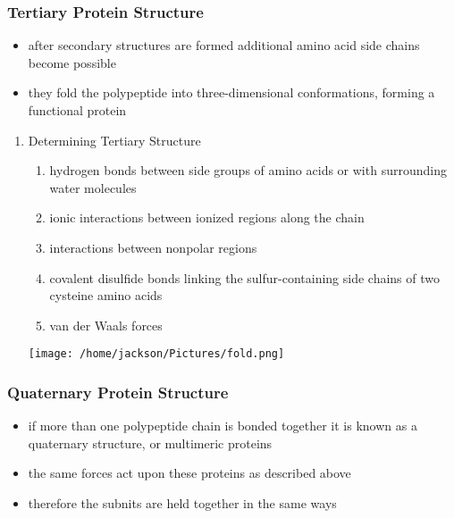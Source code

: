 \documentclass[11pt]{article}
\begin{document}
\subsubsection{Tertiary Protein Structure}
\label{sec:orgdaed8f0}
\begin{itemize}
\item after secondary structures are formed additional amino acid side chains become possible
\item they fold the polypeptide into three-dimensional conformations,  forming a functional protein
\end{itemize}
\begin{enumerate}
\item Determining Tertiary Structure
\label{sec:orga9916fd}
\begin{enumerate}
\item hydrogen bonds between side groups of amino acids or with surrounding water molecules
\item ionic interactions between ionized regions along the chain
\item interactions between nonpolar regions
\item covalent disulfide bonds linking the sulfur-containing side chains of two cysteine amino acids
\item van der Waals forces
\end{enumerate}
\begin{center}
\texttt{[image: /home/jackson/Pictures/fold.png]}
\end{center}
\end{enumerate}
\subsubsection{Quaternary Protein Structure}
\label{sec:org21dfd37}
\begin{itemize}
\item if more than one polypeptide chain is bonded together it is known as a quaternary structure, or multimeric proteins
\item the same forces act upon these proteins as described above
\item therefore the subnits are held together in the same ways
\end{itemize}
\end{document}
